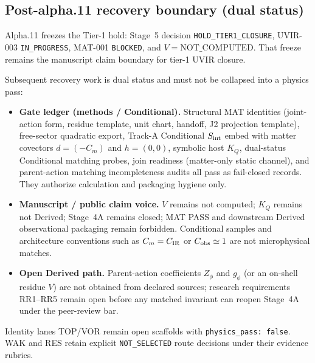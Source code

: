 \subsection{Post-alpha.11 recovery boundary (dual status)}

Alpha.11 freezes the Tier-1 hold: Stage~5 decision
\texttt{HOLD\_TIER1\_CLOSURE}, UVIR-003 \texttt{IN\_PROGRESS}, MAT-001
\texttt{BLOCKED}, and $V=\mathrm{NOT\_COMPUTED}$.  That freeze remains the
manuscript claim boundary for tier-1 UVIR closure.

Subsequent recovery work is dual status and must not be collapsed into a
physics pass:

\begin{itemize}
\item \textbf{Gate ledger (methods / Conditional).}
 Structural MAT identities
  (joint-action form, residue template, unit chart, handoff, J2 projection
  template), free-sector quadratic export, Track-A Conditional $S_{\rm int}$
  embed with matter covectors $d=(-C_m)$ and $h=(0,0)$, symbolic host $K_Q$,
  dual-status Conditional matching probes, join readiness (matter-only static
  channel), and parent-action matching incompleteness audits all pass as
  fail-closed records.  They authorize calculation and packaging hygiene only.
\item \textbf{Manuscript / public claim voice.} $V$ remains not computed;
  $K_Q$ remains not Derived; Stage~4A remains closed; MAT PASS and downstream
  Derived observational packaging remain forbidden.  Conditional samples and
  architecture conventions such as $C_m=C_{\rm IR}$ or $C_{\rm obs}\simeq 1$
  are not microphysical matches.
\item \textbf{Open Derived path.} Parent-action coefficients $Z_\phi$ and
  $g_\phi$ (or an on-shell residue $V$) are not obtained from declared
  sources; research requirements RR1--RR5 remain open before any matched
  invariant can reopen Stage~4A under the peer-review bar.
\end{itemize}

Identity lanes TOP/VOR remain open scaffolds with
\texttt{physics\_pass: false}.  WAK and RES retain explicit
\texttt{NOT\_SELECTED} route decisions under their evidence rubrics.

